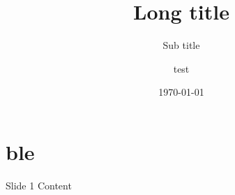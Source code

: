 \documentclass[hyperref={pdftex}]{beamer}
\title[Short Title]{Long title}
\subtitle{Sub title}
\date{\today}
\author{test}
\begin{document}
    \begin{titlepage}
    \end{titlepage}

\section{ble}
    \begin{frame}{Slide 1}
          Content
    \end{frame}
\end{document}
